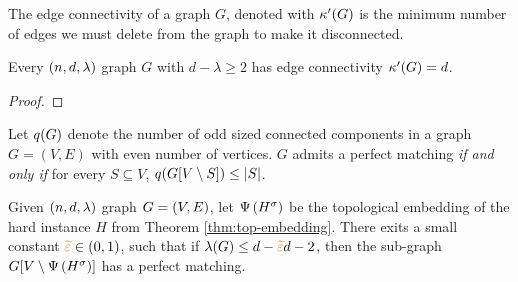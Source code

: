 \documentclass[11pt]{article}
\begin{document}
\begin{definition}\label{def:edge-connectivity}
The edge connectivity of a graph $G$, denoted with $\kappa'(G)$ is the minimum number of edges we must delete from the graph to make it disconnected.	
\end{definition}

\begin{lemma}\label{lemma:edge-connectivity-pseudorandom}
Every $(n, d, \lambda)$ graph $G$ with $d - \lambda \geq 2$ has edge connectivity $\kappa'(G) = d$.
\end{lemma}
\begin{proof}
  
\end{proof}

\begin{lemma}\label{lemma:tutte-criterion}
Let $q(G)$ denote the number of odd sized connected components in a graph $G=(V,E)$ with even number of vertices.
$G$ admits a perfect matching \emph{if and only if} for every $S \subseteq V$, $q(G[V \setminus S]) \leq |S|$.
\end{lemma}

\begin{lemma}\label{lemma:d-connected-sets-have-no-bad-sets}

\end{lemma}


\begin{theorem}\label{thm:perfect-matching}
Given $(n, d, \lambda)$ graph $G=(V,E)$, let $\Psi\left({H}^{\sigma}\right)$ be the topological embedding of the hard instance $H$ from Theorem \ref{thm:top-embedding}.
There exits a small constant $\textcolor{orange}{\widetilde{\varepsilon}} \in (0,1)$, such that 
if $\lambda(G) \leq d - \textcolor{orange}{\widetilde{\varepsilon}} d - 2$, then the sub-graph $G[V \setminus \Psi\left({H}^{\sigma}\right)]$ has a perfect matching.	
	
\end{theorem}
\end{document}
